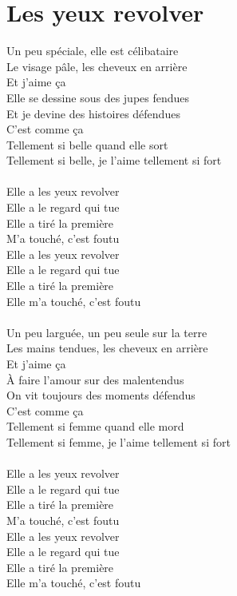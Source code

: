 \section*{Les yeux revolver}
Un peu spéciale, elle est célibataire\\
Le visage pâle, les cheveux en arrière\\
Et j'aime ça\\
Elle se dessine sous des jupes fendues\\
Et je devine des histoires défendues\\
C'est comme ça\\
Tellement si belle quand elle sort\\
Tellement si belle, je l'aime tellement si fort\\\\
Elle a les yeux revolver\\
Elle a le regard qui tue\\
Elle a tiré la première\\
M'a touché, c'est foutu\\
Elle a les yeux revolver\\
Elle a le regard qui tue\\
Elle a tiré la première\\
Elle m'a touché, c'est foutu\\\\
Un peu larguée, un peu seule sur la terre\\
Les mains tendues, les cheveux en arrière\\
Et j'aime ça\\
À faire l'amour sur des malentendus\\
On vit toujours des moments défendus\\
C'est comme ça\\
Tellement si femme quand elle mord\\
Tellement si femme, je l'aime tellement si fort\\\\
Elle a les yeux revolver\\
Elle a le regard qui tue\\
Elle a tiré la première\\
M'a touché, c'est foutu\\
Elle a les yeux revolver\\
Elle a le regard qui tue\\
Elle a tiré la première\\
Elle m'a touché, c'est foutu\\\\
